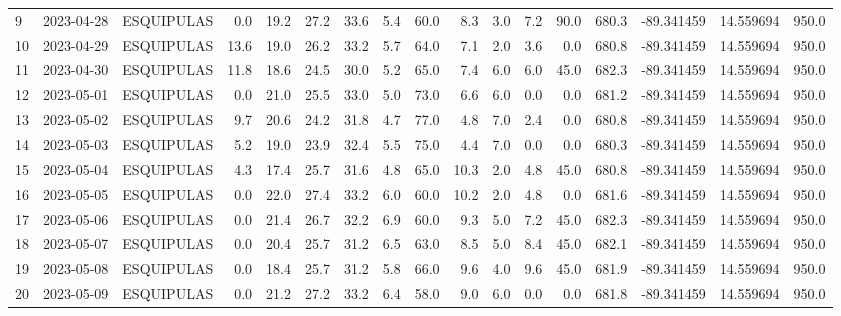 \documentclass[12pt]{article}
\begin{document}
\begin{center}
\begin{tabular}{lllrrrrrrrrrrrrrr}
9   & 2023-04-28 &  ESQUIPULAS &     0.0 &  19.2 &   27.2 &  33.6 &      5.4 &     60.0 &        8.3 &  3.0 &         7.2 &        90.0 &      680.3 & -89.341459 &  14.559694 &    950.0 \\
10  & 2023-04-29 &  ESQUIPULAS &    13.6 &  19.0 &   26.2 &  33.2 &      5.7 &     64.0 &        7.1 &  2.0 &         3.6 &         0.0 &      680.8 & -89.341459 &  14.559694 &    950.0 \\
11  & 2023-04-30 &  ESQUIPULAS &    11.8 &  18.6 &   24.5 &  30.0 &      5.2 &     65.0 &        7.4 &  6.0 &         6.0 &        45.0 &      682.3 & -89.341459 &  14.559694 &    950.0 \\
12  & 2023-05-01 &  ESQUIPULAS &     0.0 &  21.0 &   25.5 &  33.0 &      5.0 &     73.0 &        6.6 &  6.0 &         0.0 &         0.0 &      681.2 & -89.341459 &  14.559694 &    950.0 \\
13  & 2023-05-02 &  ESQUIPULAS &     9.7 &  20.6 &   24.2 &  31.8 &      4.7 &     77.0 &        4.8 &  7.0 &         2.4 &         0.0 &      680.8 & -89.341459 &  14.559694 &    950.0 \\
14  & 2023-05-03 &  ESQUIPULAS &     5.2 &  19.0 &   23.9 &  32.4 &      5.5 &     75.0 &        4.4 &  7.0 &         0.0 &         0.0 &      680.3 & -89.341459 &  14.559694 &    950.0 \\
15  & 2023-05-04 &  ESQUIPULAS &     4.3 &  17.4 &   25.7 &  31.6 &      4.8 &     65.0 &       10.3 &  2.0 &         4.8 &        45.0 &      680.8 & -89.341459 &  14.559694 &    950.0 \\
16  & 2023-05-05 &  ESQUIPULAS &     0.0 &  22.0 &   27.4 &  33.2 &      6.0 &     60.0 &       10.2 &  2.0 &         4.8 &         0.0 &      681.6 & -89.341459 &  14.559694 &    950.0 \\
17  & 2023-05-06 &  ESQUIPULAS &     0.0 &  21.4 &   26.7 &  32.2 &      6.9 &     60.0 &        9.3 &  5.0 &         7.2 &        45.0 &      682.3 & -89.341459 &  14.559694 &    950.0 \\
18  & 2023-05-07 &  ESQUIPULAS &     0.0 &  20.4 &   25.7 &  31.2 &      6.5 &     63.0 &        8.5 &  5.0 &         8.4 &        45.0 &      682.1 & -89.341459 &  14.559694 &    950.0 \\
19  & 2023-05-08 &  ESQUIPULAS &     0.0 &  18.4 &   25.7 &  31.2 &      5.8 &     66.0 &        9.6 &  4.0 &         9.6 &        45.0 &      681.9 & -89.341459 &  14.559694 &    950.0 \\
20  & 2023-05-09 &  ESQUIPULAS &     0.0 &  21.2 &   27.2 &  33.2 &      6.4 &     58.0 &        9.0 &  6.0 &         0.0 &         0.0 &      681.8 & -89.341459 &  14.559694 &    950.0 \\

\end{tabular}
\end{center}
\end{document}
